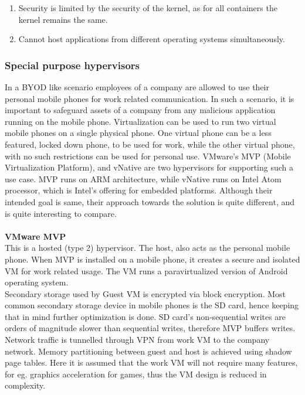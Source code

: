 \documentclass[seminar,twoside]{iitbreport}
\begin{document}
  \begin{enumerate}
  \renewcommand{\labelenumi}{(\roman{enumi})}
   \item Security is limited by the security of the kernel, as for all containers the kernel remains the same.
   \item Cannot host applications from different operating systems simultaneously.
  \end{enumerate}

  \subsubsection{Special purpose hypervisors}
  In a BYOD like scenario employees of a company are allowed to use their personal mobile phones for work related communication. In such a scenario, it is important
  to safeguard assets of a company from any malicious application running on the mobile phone. Virtualization can be used to run two virtual mobile phones
  on a single physical phone. One virtual phone can be a less featured, locked down phone, to be used for work, while the other virtual phone, with no such restrictions
  can be used for personal use. VMware's MVP (Mobile Virtualization Platform)\cite{Barr:2010:VMV:1899928.1899945}, and vNative\cite{7006388} are two hypervisors
  for supporting such a use case. 
  MVP runs on ARM architecture, while vNative runs on Intel Atom processor, which is Intel's offering for embedded platforms.
  Although their intended goal is same, their approach towards the solution is quite different, and is quite interesting to compare.
  \\\\
  \textbf{VMware MVP}
  \\
  This is a hosted (type 2) hypervisor. The host, also acts as the personal mobile phone. When MVP is installed on a mobile phone, it creates a secure and isolated VM for work related usage.
  The VM runs a paravirtualized version of Android operating system.\\
  Secondary storage used by Guest VM is encrypted via block encryption. Most common secondary storage device in mobile phones is the SD card, hence keeping that 
  in mind further optimization is done. SD card's non-sequential writes are orders of magnitude slower than sequential writes, therefore MVP buffers writes.
  Network traffic is tunnelled through VPN from work VM to the company network. Memory partitioning between guest and host is achieved using shadow page tables.
  Here it is assumed that the work VM will not require many features, for eg. graphics acceleration for games, thus the VM design is reduced in complexity.
\end{document}
